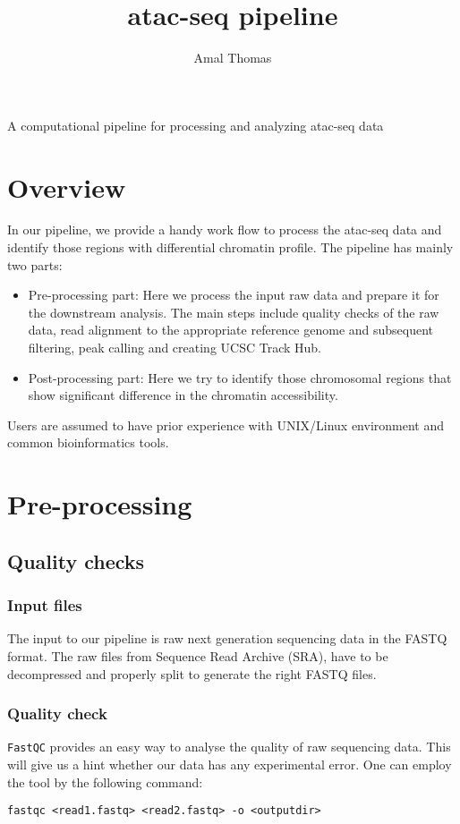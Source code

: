 \documentclass[10pt]{article}
\title{\bf atac-seq pipeline}
\author{Amal Thomas}
\newcommand{\prog}[1]{\texttt{#1}}
\begin{document}
\maketitle

\begin{center}
A computational pipeline for processing and analyzing atac-seq data
\end{center} 

\tableofcontents
\newpage
\section{Overview}
In our pipeline, we provide a handy work flow to process the atac-seq data and identify those regions with differential chromatin profile. The pipeline has mainly two parts:
\begin{itemize}
\item Pre-processing part: Here we process the input raw data and prepare it for the downstream analysis. The main steps include quality checks of the raw data, read alignment to the appropriate reference genome and subsequent filtering, peak calling and creating UCSC Track Hub. 
\item Post-processing part: Here we try to identify those chromosomal regions that show significant difference in the chromatin accessibility. 
\end{itemize}
Users are assumed to have prior experience with UNIX/Linux environment and common bioinformatics tools.

\section{Pre-processing}

\subsection{Quality checks}
\subsubsection{Input files} The input to our pipeline is raw next generation sequencing data in the FASTQ format. The raw files from Sequence Read Archive (SRA), have to be decompressed and properly split to generate the right FASTQ files.
\subsubsection{Quality check} \prog{FastQC} provides an easy way to analyse the quality of raw sequencing data. This will give us a hint whether our data has any experimental error. One can employ the tool by the following command:
\begin{verbatim}
fastqc <read1.fastq> <read2.fastq> -o <outputdir>
\end{verbatim}
\end{document}
